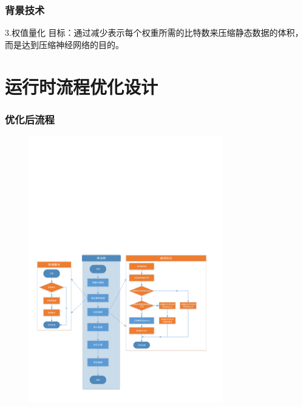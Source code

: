 \documentclass[12pt]{ctexbeamer}
\begin{document}
\begin{frame}
  \frametitle{背景技术}
  \begin{block}{3.权值量化}
    目标：通过减少表示每个权重所需的比特数来压缩静态数据的体积，而是达到压缩神经网络的目的。
  \end{block}
\end{frame}


\section{运行时流程优化设计}
\begin{frame}
  \frametitle{优化后流程}
   \begin{figure}
      \includegraphics[width=0.75\textwidth]{figures/process_optimize.pdf}
   \end{figure}
\end{frame}
\end{document}
